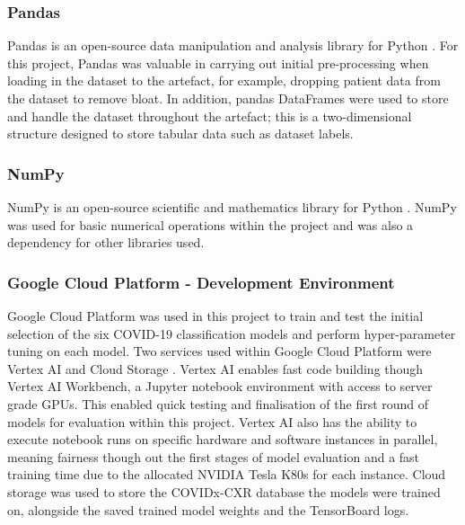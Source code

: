\subsubsection{Pandas}
Pandas is an open-source data manipulation and analysis library for Python \citep{pandasPy63:online}. For this project, Pandas was valuable in carrying out initial pre-processing when loading in the dataset to the artefact, for example, dropping patient data from the dataset to remove bloat. In addition, pandas DataFrames were used to store and handle the dataset throughout the artefact; this is a two-dimensional structure designed to store tabular data such as dataset labels.

\subsubsection{NumPy}
NumPy is an open-source scientific and mathematics library for Python \citep{NumPy90:online}. NumPy was used for basic numerical operations within the project and was also a dependency for other libraries used.

\subsubsection{Google Cloud Platform - Development Environment}
Google Cloud Platform was used in this project to train and test the initial selection of the six COVID-19 classification models and perform hyper-parameter tuning on each model. Two services used within Google Cloud Platform were Vertex AI \citep{VertexAI57:online} and Cloud Storage \citep{CloudSto72:online}. Vertex AI enables fast code building though Vertex AI Workbench, a Jupyter notebook environment with access to server grade GPUs. This enabled quick testing and finalisation of the first round of models for evaluation within this project. Vertex AI also has the ability to execute notebook runs on specific hardware and software instances in parallel, meaning fairness though out the first stages of model evaluation and a fast training time due to the allocated NVIDIA Tesla K80s for each instance. Cloud storage was used to store the COVIDx-CXR database the models were trained on, alongside the saved trained model weights and the TensorBoard logs.

